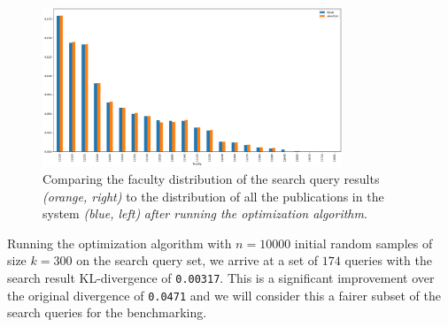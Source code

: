 \begin{figure}[ht!]
    \captionsetup{width=.9\linewidth}
    \includegraphics[width=0.8\textwidth]{../img/all-queries-vs-totals-corrected.png}
    \centering
    \caption{Comparing the faculty distribution of the search query results \textit{(orange, right)} to the distribution of all the publications in the system \textit{(blue, left)} \textit{after running the optimization algorithm}.}
\end{figure}

Running the optimization algorithm with $n = 10000$ initial random samples of size $k = 300$ on the search query set, we arrive at a set of $174$ queries with the search result KL-divergence of \texttt{0.00317}. 
This is a significant improvement over the original divergence of \texttt{0.0471} and we will consider this a fairer subset of the search queries for the benchmarking.
